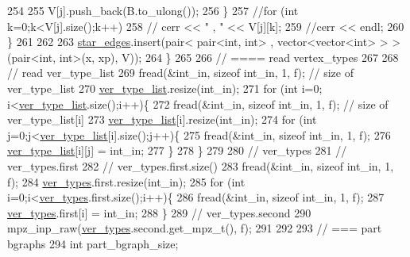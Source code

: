 \begin{DoxyCode}
254 
255         V[j].push\_back(B.to\_ulong());
256       \}
257       \textcolor{comment}{//for (int k=0;k<V[j].size();k++)}
258       \textcolor{comment}{//  cerr << " , " << V[j][k];}
259       \textcolor{comment}{//cerr << endl;}
260     \}
261 
262 
263     \hyperlink{classmarked__graph__compressed_a7df5779d313486644132bd816937f532}{star\_edges}.insert(pair< pair<int, int> , vector<vector<int> > > (pair<int, int>(x, xp), V));
264   \}
265 
266   \textcolor{comment}{// ==== read vertex\_types}
267 
268   \textcolor{comment}{// read ver\_type\_list}
269   fread(&int\_in, \textcolor{keyword}{sizeof} int\_in, 1, f); \textcolor{comment}{// size of ver\_type\_list}
270   \hyperlink{classmarked__graph__compressed_af2e3e55223d436628a02758dfae88493}{ver\_type\_list}.resize(int\_in);
271   \textcolor{keywordflow}{for} (\textcolor{keywordtype}{int} i=0; i<\hyperlink{classmarked__graph__compressed_af2e3e55223d436628a02758dfae88493}{ver\_type\_list}.size();i++)\{
272     fread(&int\_in, \textcolor{keyword}{sizeof} int\_in, 1, f); \textcolor{comment}{// size of ver\_type\_list[i]}
273     \hyperlink{classmarked__graph__compressed_af2e3e55223d436628a02758dfae88493}{ver\_type\_list}[i].resize(int\_in);
274     \textcolor{keywordflow}{for} (\textcolor{keywordtype}{int} j=0;j<\hyperlink{classmarked__graph__compressed_af2e3e55223d436628a02758dfae88493}{ver\_type\_list}[i].size();j++)\{
275       fread(&int\_in, \textcolor{keyword}{sizeof} int\_in, 1, f);
276       \hyperlink{classmarked__graph__compressed_af2e3e55223d436628a02758dfae88493}{ver\_type\_list}[i][j] = int\_in;
277     \}
278   \}
279 
280   \textcolor{comment}{// ver\_types}
281   \textcolor{comment}{// ver\_types.first}
282   \textcolor{comment}{// ver\_types.first.size()}
283   fread(&int\_in, \textcolor{keyword}{sizeof} int\_in, 1, f);
284   \hyperlink{classmarked__graph__compressed_af446cc5e23c241a92b76642fd5ebc403}{ver\_types}.first.resize(int\_in);
285   \textcolor{keywordflow}{for} (\textcolor{keywordtype}{int} i=0;i<\hyperlink{classmarked__graph__compressed_af446cc5e23c241a92b76642fd5ebc403}{ver\_types}.first.size();i++)\{
286     fread(&int\_in, \textcolor{keyword}{sizeof} int\_in, 1, f);
287     \hyperlink{classmarked__graph__compressed_af446cc5e23c241a92b76642fd5ebc403}{ver\_types}.first[i] = int\_in;
288   \}
289   \textcolor{comment}{// ver\_types.second}
290   mpz\_inp\_raw(\hyperlink{classmarked__graph__compressed_af446cc5e23c241a92b76642fd5ebc403}{ver\_types}.second.get\_mpz\_t(), f);
291 
292 
293   \textcolor{comment}{// === part bgraphs}
294   \textcolor{keywordtype}{int} part\_bgraph\_size;

\end{DoxyCode}

